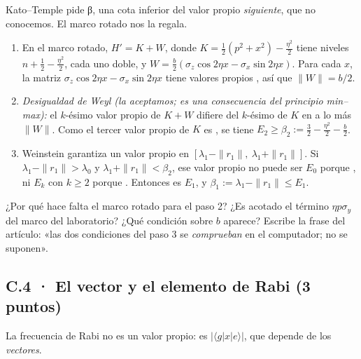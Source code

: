 Kato--Temple pide β, una cota inferior del valor propio \emph{siguiente}, que no conocemos. El marco rotado nos la regala.

\begin{enumerate}
\def\labelenumi{\arabic{enumi}.}
\item En el marco rotado, $H' = K + W$, donde $K = \tfrac12(p^2+x^2) - \tfrac{\eta^2}{2}$ tiene niveles $n + \tfrac12 - \tfrac{\eta^2}{2}$, cada uno doble, y $W = \tfrac b2(\sigma_z\cos2\eta x - \sigma_x\sin2\eta x)$. Para cada $x$, la matriz $\sigma_z\cos2\eta x - \sigma_x\sin2\eta x$ tiene valores propios , así que $\|W\| = b/2$.
\item \emph{Desigualdad de Weyl (la aceptamos; es una consecuencia del principio min--max):} el $k$-ésimo valor propio de $K+W$ difiere del $k$-ésimo de $K$ en a lo más $\|W\|$. Como el tercer valor propio de $K$ es , se tiene $E_2 \ge \beta_2 := \tfrac32 - \tfrac{\eta^2}{2} - \tfrac b2$.
\item Weinstein garantiza un valor propio en $[\lambda_1 - \|r_1\|,\ \lambda_1 + \|r_1\|]$. Si $\lambda_1 - \|r_1\| > \lambda_0$ y $\lambda_1 + \|r_1\| < \beta_2$, ese valor propio no puede ser $E_0$ porque , ni $E_k$ con $k \ge 2$ porque . Entonces es $E_1$, y $\beta_1 := \lambda_1 - \|r_1\| \le E_1$.
\end{enumerate}
¿Por qué hace falta el marco rotado para el paso 2? ¿Es acotado el término $\eta p\sigma_y$ del marco del laboratorio? ¿Qué condición sobre $b$ aparece? Escribe la frase del artículo: «las dos condiciones del paso 3 se \emph{comprueban} en el computador; no se suponen».


\subsection{C.4 · El vector y el elemento de Rabi (3 puntos)}

La frecuencia de Rabi no es un valor propio: es $|\langle g|x|e\rangle|$, que depende de los \emph{vectores}.

